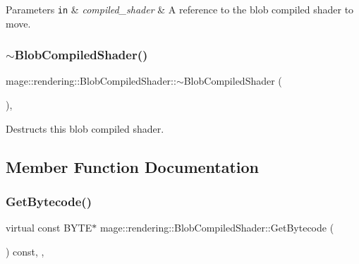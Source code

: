 \begin{DoxyParams}[1]{Parameters}
\mbox{\tt in}  & {\em compiled\+\_\+shader} & A reference to the blob compiled shader to move. \\
\hline
\end{DoxyParams}
\hypertarget{classmage_1_1rendering_1_1_blob_compiled_shader_ac983a2506dfe81e8e8ceb2b9ffa420d6}{}\label{classmage_1_1rendering_1_1_blob_compiled_shader_ac983a2506dfe81e8e8ceb2b9ffa420d6} 
\subsubsection{\texorpdfstring{$\sim$\+Blob\+Compiled\+Shader()}{~BlobCompiledShader()}}
{\footnotesize\ttfamily mage\+::rendering\+::\+Blob\+Compiled\+Shader\+::$\sim$\+Blob\+Compiled\+Shader (\begin{DoxyParamCaption}{ }\end{DoxyParamCaption})\hspace{0.3cm}{\ttfamily [virtual]}, {\ttfamily [default]}}

Destructs this blob compiled shader. 

\subsection{Member Function Documentation}
\hypertarget{classmage_1_1rendering_1_1_blob_compiled_shader_a4d7f3d2d9864cb12939386ff031bd783}{}\label{classmage_1_1rendering_1_1_blob_compiled_shader_a4d7f3d2d9864cb12939386ff031bd783} 
\subsubsection{\texorpdfstring{Get\+Bytecode()}{GetBytecode()}}
{\footnotesize\ttfamily virtual const B\+Y\+TE$\ast$ mage\+::rendering\+::\+Blob\+Compiled\+Shader\+::\+Get\+Bytecode (\begin{DoxyParamCaption}{ }\end{DoxyParamCaption}) const\hspace{0.3cm}{\ttfamily [override]}, {\ttfamily [virtual]}, {\ttfamily [noexcept]}}

